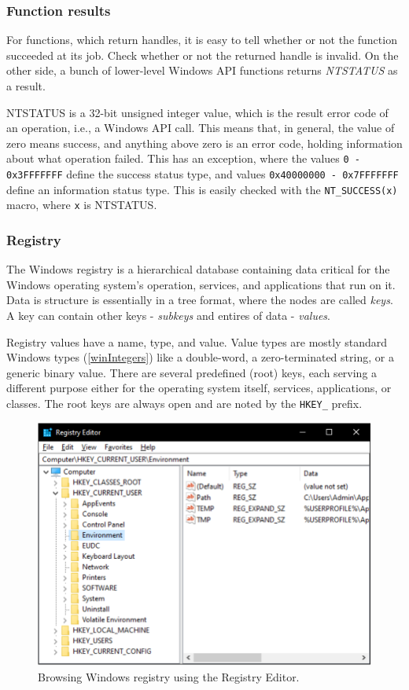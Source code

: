 \subsubsection{Function results}
For functions, which return handles, it is easy to tell whether or not the function succeeded at its job. Check whether or not the returned handle is invalid. On the other side, a bunch of lower-level Windows API functions returns \textit{NTSTATUS} as a result.

NTSTATUS is a 32-bit unsigned integer value, which is the result error code of an operation, i.e., a Windows API call. This means that, in general, the value of zero means success, and anything above zero is an error code, holding information about what operation failed. This has an exception, where the values \lstinline{0 - 0x3FFFFFFF} define the success status type, and values 
\lstinline{0x40000000 - 0x7FFFFFFF} define an information status type. This is easily checked with the \lstinline{NT_SUCCESS(x)} macro, where \lstinline{x} is NTSTATUS.\cite{WinNTSTATUS}\cite{WinNTSuccess}

\subsubsection{Registry}
The Windows registry is a hierarchical database containing data critical for the Windows operating system's operation, services, and applications that run on it. Data is structure is essentially in a tree format, where the nodes are called \textit{keys}. A key can contain other keys - \textit{subkeys} and entires of data - \textit{values}. 

Registry values have a name, type, and value. Value types are mostly standard Windows types (\ref{winIntegers}) like a double-word, a zero-terminated string, or a generic binary value. There are several predefined (root) keys, each serving a different purpose either for the operating system itself, services, applications, or classes. The root keys are always open and are noted by the \lstinline{HKEY_} prefix.

\begin{figure}[htb!]
	\centering
	\includegraphics[]{obrazky-figures/regedit.pdf}
	\caption{Browsing Windows registry using the Registry Editor.}
	\label{winRegedit}
\end{figure}

